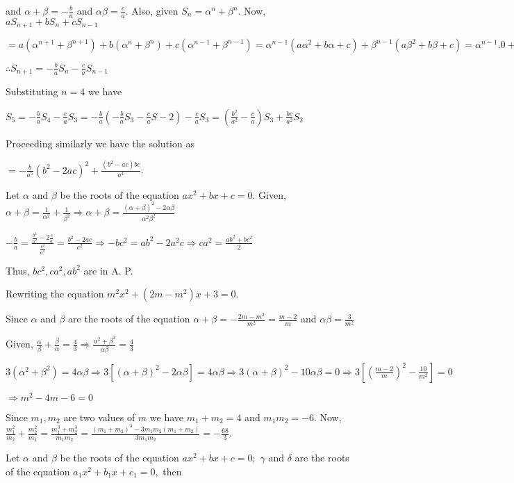   and $\alpha + \beta = -\frac{b}{a}$ and $\alpha\beta = \frac{c}{a}.$ Also, given $S_n = \alpha^n +
  \beta^n$. Now, $aS_{n + 1} + bS_n + cS_{n - 1}$

  $= a(\alpha^{n + 1} + \beta^{n + 1}) + b(\alpha^n + \beta^n) + c(\alpha^{n - 1} + \beta^{n - 1}) =
  \alpha^{n - 1}(a\alpha^2 + b\alpha + c) + \beta^{n - 1}(a\beta^2 + b\beta + c) = \alpha^{n - 1}.0 +
  \beta^{n - 1}.0$

  $\therefore S_{n + 1} = -\frac{b}{a}S_n -\frac{c}{a}S_{n - 1}$

  Substituting $n = 4$ we have

  $S_5 = -\frac{b}{a}S_4 - \frac{c}{a}S_3 = -\frac{b}{a}(-\frac{b}{a}S_3 - \frac{c}{a}S-2) - \frac{c}{a}S_3
  = \left(\frac{b^2}{a^2} - \frac{c}{a}\right)S_3 + \frac{bc}{a^2}S_2$

  Proceeding similarly we have the solution as

  $= -\frac{b}{a^5}(b^2 - 2ac)^2 + \frac{(b^2 - ac)bc}{a^4}$.
\item Let $\alpha$ and $\beta$ be the roots of the equation $ax^2 + bx + c = 0$. Given, $\alpha + \beta =
  \frac{1}{\alpha^2} + \frac{1}{\beta^2}\Rightarrow \alpha + \beta = \frac{(\alpha + \beta)^2 -
    2\alpha\beta}{\alpha^2\beta^2}$

  $-\frac{b}{a} = \frac{\frac{b^2}{a^2} - 2\frac{c}{a}}{\frac{c^2}{a^2}} = \frac{b^2 - 2ac}{c^2}\Rightarrow
  -bc^2 = ab^2 - 2a^2c \Rightarrow ca^2 = \frac{ab^2 + bc^2}{2}$

  Thus, $bc^2, ca^2, ab^2$ are in A. P.
\item Rewriting the equation $m^2x^2 + (2m - m^2)x + 3 = 0$.

  Since $\alpha$ and $\beta$ are the roots of the equation $\alpha + \beta = -\frac{2m - m^2}{m^2} = \frac{m -
    2}{m}$ and $\alpha\beta = \frac{3}{m^2}$

  Given, $\frac{\alpha}{\beta} + \frac{\beta}{\alpha} = \frac{4}{3} \Rightarrow \frac{\alpha^2 + \beta^2}{\alpha\beta} =
  \frac{4}{3}$

  $3(\alpha^2 + \beta^2) = 4\alpha\beta \Rightarrow 3[(\alpha + \beta)^2 - 2\alpha\beta] =
  4\alpha\beta\Rightarrow 3(\alpha + \beta)^2 - 10\alpha\beta = 0 \Rightarrow 3\left[\left(\frac{m -
      2}{m}\right)^2 - \frac{10}{m^2}\right] = 0$

  $\Rightarrow m^2 - 4m - 6 = 0$

  Since $m_1, m_2$ are two values of $m$ we have $m_1 + m_2 = 4$ and $m_1m_2 = -6$. Now, $\frac{m_1^2}{m_2}
  + \frac{m_2^2}{m_1} = \frac{m_1^3 + m_2^3}{m_1m_2} = \frac{(m_1 + m_2)^3 - 3m_1m_2(m_1 + m_2)}{3m_1m_2} =
  -\frac{68}{3}$.
\item Let $\alpha$ and $\beta$ be the roots of the equation $ax^2 + bx + c = 0;$ $\gamma$ and $\delta$
  are the roots of the equation $a_1x^2 + b_1x + c_1 = 0,$ then

